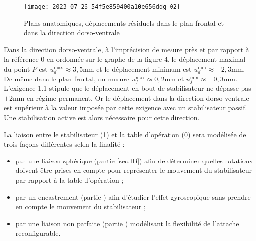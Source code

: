 \begin{figure}[!h]
\centering
\texttt{[image: 2023\_07\_26\_54f5e859400a10e656ddg-02]}
\caption{Plans anatomiques, déplacements résiduels dans le plan frontal et dans la direction dorso-ventrale\label{fig_ccspsi2022:04}}
\end{figure}
\fi

\ifprof
\begin{corrige}
Dans la direction dorso-ventrale, à l'imprécision de mesure près et par rapport à la référence 0 en ordonnée sur le graphe de la figure 4, le déplacement maximal du point $P$ est $u_d^{\text{max}} \approx 3,5$mm et le déplacement minimum est  $u_d^{\text{min}} \approx -2,3$mm.\\

De même dans le plan frontal, on mesure $u_f^{\text{max}} \approx 0,2$mm et $u_f^{\text{min}} \approx -0,3$mm.\\

L'exigence 1.1 stipule que le déplacement en bout de stabilisateur ne dépasse pas $\pm 2$mm en régime permanent. Or le déplacement dans la direction dorso-ventrale est supérieur à la valeur imposée par cette exigence avec un stabilisateur passif. Une stabilisation active est alors nécessaire pour cette direction.
\end{corrige}
\else
\fi

\ifprof
\else
La liaison entre le stabilisateur (1) et la table d'opération (0) sera modélisée de trois façons différentes selon la finalité :

\begin{itemize}
  \item par une liaison sphérique (partie \ref{sec:IB}) afin de déterminer quelles rotations doivent être prises en compte pour représenter le mouvement du stabilisateur par rapport à la table d'opération ;
  \item par un encastrement (partie \label{sec:IIA}) afin d'étudier l'effet gyroscopique sans prendre en compte le mouvement du stabilisateur ;
  \item par une liaison non parfaite (partie \label{sec:IIC}) modélisant la flexibilité de l'attache reconfigurable.
\end{itemize}
\fi

